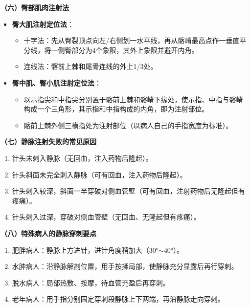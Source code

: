 \documentclass[11pt, a4paper]{ctexart}
\begin{document}
\textbf{（六）臀部肌肉注射法}
\begin{itemize}
	\item \textbf{臀大肌注射定位法}：
	      \begin{itemize}
		      \item 十字法：先从臀裂顶点向左/右侧划一水平线，再从髂嵴最高点作一垂直平分线，将一侧臀部分为4个象限，其外上象限并避开内角。
		      \item 连线法：髂前上棘和尾骨连线的外上1/3处。
	      \end{itemize}
	\item \textbf{臀中肌、臀小肌注射定位法}：
	      \begin{itemize}
		      \item 以示指尖和中指尖分别置于髂前上棘和髂嵴下缘处，使示指、中指与髂嵴构成一个三角形，其示指和中指构成的内角，即为注射部位。
		      \item 髂前上棘外侧三横指处为注射部位（以病人自己的手指宽度为标准）。
	      \end{itemize}
\end{itemize}

\textbf{（七）静脉注射失败的常见原因}
\begin{enumerate}
	\item 针头未刺入静脉（无回血，注入药物后隆起）。
	\item 针头斜面未完全刺入静脉（可有回血，注入药物后隆起）。
	\item 针头刺入较深，斜面一半穿破对侧血管壁（可有回血，注射药物后无隆起但有疼痛）。
	\item 针头刺入过深，穿破对侧血管壁（无回血、无隆起但有疼痛）。
\end{enumerate}

\textbf{（八）特殊病人的静脉穿刺要点}
\begin{enumerate}
	\item 肥胖病人：静脉上方进针，进针角度稍加大（30°$\sim$40°）。
	\item 水肿病人：沿静脉解剖位置，用手按揉局部，使静脉充分显露后再行穿刺。
	\item 脱水病人：局部热敷、按摩，待血管充盈后再穿刺。
	\item 老年病人：用手指分别固定穿刺段静脉上下两端，再沿静脉走向穿刺。
\end{enumerate}
\end{document}
